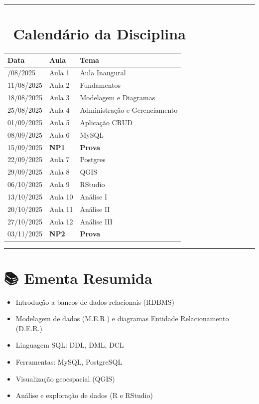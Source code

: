 \documentclass[
]{book}
\providecommand{\tightlist}{%
  \setlength{\itemsep}{0pt}\setlength{\parskip}{0pt}}
\begin{document}
\begin{center}\rule{0.5\linewidth}{0.5pt}\end{center}

\chapter{📅 Calendário da Disciplina}\label{calenduxe1rio-da-disciplina}

\begin{longtable}[]{@{}lll@{}}
\toprule\noalign{}
Data & Aula & Tema \\
\midrule\noalign{}
\endhead
\bottomrule\noalign{}
\endlastfoot
04/08/2025 & Aula 1 & Aula Inaugural \\
11/08/2025 & Aula 2 & Fundamentos \\
18/08/2025 & Aula 3 & Modelagem e Diagramas \\
25/08/2025 & Aula 4 & Administração e Gerenciamento \\
01/09/2025 & Aula 5 & Aplicação CRUD \\
08/09/2025 & Aula 6 & MySQL \\
15/09/2025 & \textbf{NP1} & \textbf{Prova} \\
22/09/2025 & Aula 7 & Postgres \\
29/09/2025 & Aula 8 & QGIS \\
06/10/2025 & Aula 9 & RStudio \\
13/10/2025 & Aula 10 & Análise I \\
20/10/2025 & Aula 11 & Análise II \\
27/10/2025 & Aula 12 & Análise III \\
03/11/2025 & \textbf{NP2} & \textbf{Prova} \\
\end{longtable}

\begin{center}\rule{0.5\linewidth}{0.5pt}\end{center}

\chapter{📚 Ementa Resumida}\label{ementa-resumida}

\begin{itemize}
\tightlist
\item
  Introdução a bancos de dados relacionais (RDBMS)
\item
  Modelagem de dados (M.E.R.) e diagramas Entidade Relacionamento (D.E.R.)
\item
  Linguagem SQL: DDL, DML, DCL
\item
  Ferramentas: MySQL, PostgreSQL
\item
  Visualização geoespacial (QGIS)
\item
  Análise e exploração de dados (R e RStudio)
\end{itemize}
\end{document}
